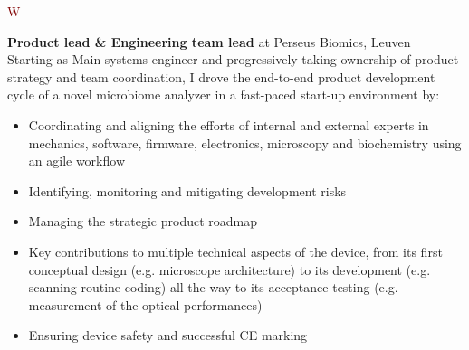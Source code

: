 \documentclass[9pt,a4paper]{article}
\begin{document}
\begin{cv}{}
        \begin{cvlist}{\textcolor{Maroon}{W}}\label{Experience}
            \item[2021 $\rightarrow$ present] \textbf{Product lead \& Engineering team lead} at Perseus Biomics, Leuven\\ %
            Starting as Main systems engineer and progressively taking ownership of product strategy and team coordination, I drove the end-to-end product development cycle of a novel microbiome analyzer in a fast-paced start-up environment by: %
            \begin{itemize}
                \item Coordinating and aligning the efforts of internal and external experts in mechanics, software, firmware, electronics, microscopy and biochemistry using an agile workflow %
				\item Identifying, monitoring and mitigating development risks %
                \item Managing the strategic product roadmap
                \item Key contributions to multiple technical aspects of the device, from its first conceptual design (e.g. microscope architecture) to its development (e.g. scanning routine coding) all the way to its acceptance testing (e.g. measurement of the optical performances)
                \item Ensuring device safety and successful CE marking
			\end{itemize}

\end{cvlist}
\end{cv}
\end{document}
